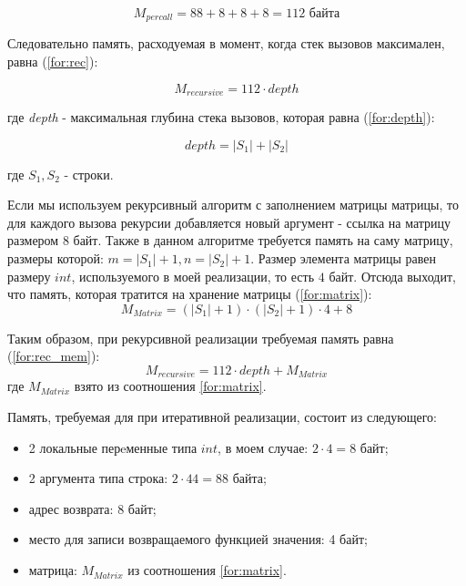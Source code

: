 \begin{equation}
M_{per call} = 88 + 8 + 8 + 8 = 112 \text{ байта}
\label{for:onecall}
\end{equation}

Следовательно память, расходуемая в момент, когда стек вызовов максимален, равна (\ref{for:rec}): 

\begin{equation}
    M_{recursive} = 112 \cdot depth
\label{for:rec}
\end{equation}

где \textit{depth} - максимальная глубина стека вызовов, которая равна (\ref{for:depth}):

\begin{equation}
depth = |S_1| + |S_2|
\label{for:depth}
\end{equation}

где $S_1, S_2$ - строки.

Если мы используем рекурсивный алгоритм с заполнением матрицы матрицы, то для каждого вызова рекурсии добавляется новый аргумент - ссылка на матрицу размером $8$ байт. Также в данном алгоритме требуется память на саму матрицу, размеры которой: $m = |S_1| + 1, n = |S_2| + 1$. Размер элемента матрицы равен размеру $int$, используемого в моей реализации, то есть $4$ байт. Отсюда выходит, что память, которая тратится на хранение матрицы (\ref{for:matrix}):
\begin{equation}
M_{Matrix} = (|S_1| + 1) \cdot (|S_2| + 1) \cdot 4 + 8
\label{for:matrix}
\end{equation}

Таким образом, при рекурсивной реализации требуемая память равна (\ref{for:rec_mem}):
\begin{equation}
M_{recursive} = 112 \cdot depth + M_{Matrix}
\label{for:rec_mem}
\end{equation}
где $M_{Matrix}$ взято из соотношения \ref{for:matrix}.

Память, требуемая для при итеративной реализации, состоит из следующего:
\begin{itemize}
    \item 2 локальные перeменные типа $int$, в моем случае: $2 \cdot 4 = 8$ байт;
    \item 2 аргумента типа строка: $2 \cdot 44 = 88$ байта;
    \item адрес возврата: 8 байт;
    \item место для записи возвращаемого функцией значения: 4 байт;
    \item матрица: $M_{Matrix}$ из соотношения \ref{for:matrix}.
\end{itemize}

